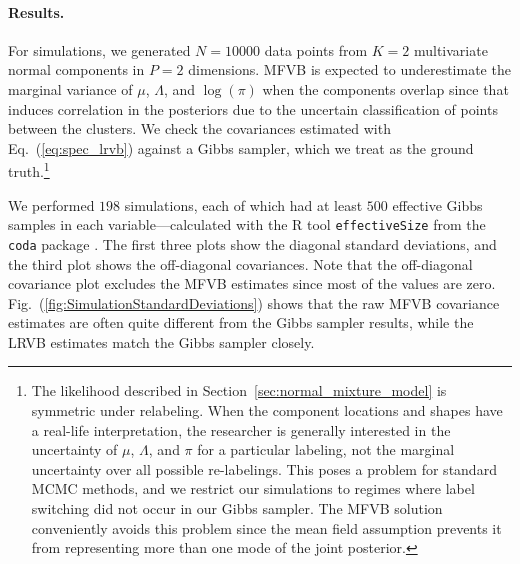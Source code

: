 \documentclass{article}\usepackage[]{graphicx}\usepackage[]{color}
\newcommand{\mysec}[1]{Section~\ref{sec:#1}}
\newcommand{\eq}[1]{Eq.~(\ref{eq:#1})}
\newcommand{\fig}[1]{Fig.~(\ref{fig:#1})}
\begin{document}
%
\newcommand{\MNISTn}{12665}
\newcommand{\MNISTTestN}{2115}
\newcommand{\MNISTp}{25}
\newcommand{\MNISTTestAccuracy}{0.92}
\newcommand{\MNISTTestError}{0.08}

%

%
\newcommand{\GMMeffsizecutoff}{500}
\newcommand{\GMMsimulationsize}{198}
\newcommand{\GMMsimulationn}{10000}
\newcommand{\GMMsimulationp}{2}
\newcommand{\GMMsimulationk}{2}
\newcommand{\GMMsimulationvbtime}{2.82}
\newcommand{\GMMsimulationgibbstime}{444.44}


\paragraph{Results.} %

For simulations, we generated $N=\GMMsimulationn$ data points from
$K=\GMMsimulationk$ multivariate normal components in
$P=\GMMsimulationp$ dimensions.  MFVB is expected
to underestimate the marginal variance of $\mu$, $\Lambda$, and $\log(\pi)$
when the components overlap since that induces correlation in the
posteriors due to the uncertain classification of points between the
clusters. We check the covariances estimated with
\eq{spec_lrvb} against a Gibbs sampler, which we treat as the ground
truth.\footnote{The likelihood described in \mysec{normal_mixture_model} is symmetric under
relabeling.  When the component locations and shapes have
a real-life interpretation, the researcher is generally
interested in the uncertainty of $\mu$, $\Lambda$, and $\pi$ for a
particular labeling, not the
marginal uncertainty over all possible re-labelings.  This poses
a problem for standard MCMC methods, and we restrict our simulations
to regimes where label switching did not occur in our Gibbs sampler.
The MFVB solution conveniently avoids this problem since the mean field
assumption prevents it from representing more than one mode of the
joint posterior.}

We performed $\GMMsimulationsize$ simulations, each of which had
at least $\GMMeffsizecutoff$ effective Gibbs
samples in each variable---calculated with the R tool \texttt{effectiveSize}
from the \texttt{coda} package \citep{rpackage:coda}.
The first three plots show the diagonal standard deviations,
and the third plot shows the off-diagonal covariances.  Note
that the off-diagonal covariance plot excludes the MFVB estimates since most
of the values are zero.
%
\fig{SimulationStandardDeviations} shows that the
raw MFVB covariance estimates are often quite different from the
Gibbs sampler results, while the LRVB estimates match
the Gibbs sampler closely.
\end{document}
